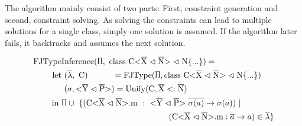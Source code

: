 The algorithm mainly consist of two parts:
First, constraint generation and second, constraint solving.
As solving the constraints can lead to multiple solutions for a single class, simply one solution is assumed. If the algorithm later fails, it backtracks and assumes the next solution.

\begin{align*}
    \text{FJType}&\text{Inference}(\sprod{0.7}, \ \classheader \{ ... \}) = \\
    \text{let} & \ (\overline{\lambda}, \ \text{C}) \quad \quad \quad = \text{FJType}(\sprod{0.7}, \classheader \{ ... \}) \\
    & \ (\sigma, \yp) = \text{Unify}(\text{C}, \overline{\text{X}} <: \overline{\text{N}}) \\
    \text{in} \ & \sprod{0.7} \cup \ \{( \cm \ : \ \yp \ \oto{\sigma(a)}) \ | \\
    & \quad \quad \quad \quad \quad \quad \quad \quad \quad \quad \quad \quad \quad (\cm : \oto{a} ) \in \overline{\lambda} \}
\end{align*}
